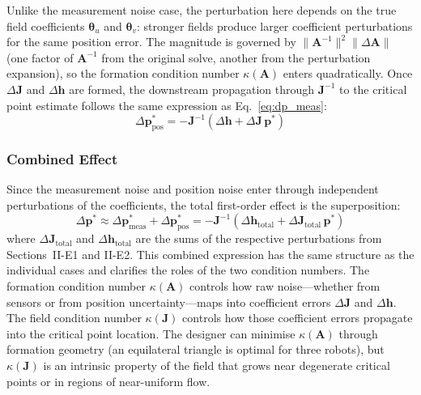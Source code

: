 \documentclass[lettersize,journal]{IEEEtran}
\begin{document}
Unlike the measurement noise case, the perturbation here depends on the true field coefficients $\boldsymbol{\theta}_u$ and $\boldsymbol{\theta}_v$: stronger fields produce larger coefficient perturbations for the same position error. The magnitude is governed by $\|\mathbf{A}^{-1}\|^2\|\Delta\mathbf{A}\|$ (one factor of $\mathbf{A}^{-1}$ from the original solve, another from the perturbation expansion), so the formation condition number $\kappa(\mathbf{A})$ enters quadratically. Once $\Delta\mathbf{J}$ and $\Delta\mathbf{h}$ are formed, the downstream propagation through $\mathbf{J}^{-1}$ to the critical point estimate follows the same expression as Eq.~\eqref{eq:dp_meas}:
\begin{equation}
    \Delta\mathbf{p}^*_{\text{pos}} = -\mathbf{J}^{-1}\!\left(\Delta\mathbf{h} + \Delta\mathbf{J}\,\mathbf{p}^*\right)
    \label{eq:dp_pos}
\end{equation}

\subsubsection{Combined Effect}

Since the measurement noise and position noise enter through independent perturbations of the coefficients, the total first-order effect is the superposition:
\begin{equation}
    \Delta\mathbf{p}^* \approx \Delta\mathbf{p}^*_{\text{meas}} + \Delta\mathbf{p}^*_{\text{pos}} = -\mathbf{J}^{-1}\!\left(\Delta\mathbf{h}_{\text{total}} + \Delta\mathbf{J}_{\text{total}}\,\mathbf{p}^*\right)
    \label{eq:dp_combined}
\end{equation}
where $\Delta\mathbf{J}_{\text{total}}$ and $\Delta\mathbf{h}_{\text{total}}$ are the sums of the respective perturbations from Sections~II-E1 and II-E2. This combined expression has the same structure as the individual cases and clarifies the roles of the two condition numbers. The formation condition number $\kappa(\mathbf{A})$ controls how raw noise---whether from sensors or from position uncertainty---maps into coefficient errors $\Delta\mathbf{J}$ and $\Delta\mathbf{h}$. The field condition number $\kappa(\mathbf{J})$ controls how those coefficient errors propagate into the critical point location. The designer can minimise $\kappa(\mathbf{A})$ through formation geometry (an equilateral triangle is optimal for three robots), but $\kappa(\mathbf{J})$ is an intrinsic property of the field that grows near degenerate critical points or in regions of near-uniform flow.
\end{document}
